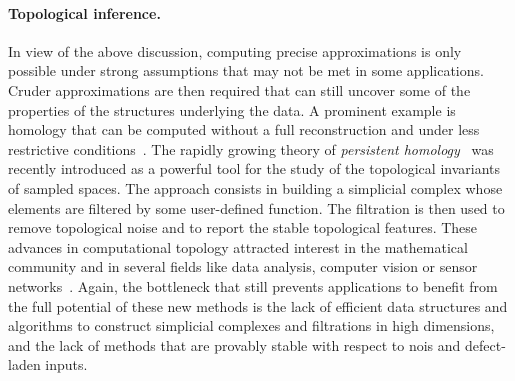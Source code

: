 \paragraph{Topological inference.}
In view of the above discussion, computing precise approximations is only possible under strong assumptions that may not be met in some applications. Cruder approximations are then required
that can still  uncover some of the properties of the structures underlying the data.
%
%
A prominent example is homology that can be computed  without a full reconstruction and under less restrictive conditions~\cite{geometrica-ccl09,nsw-fhm-2008}. The rapidly growing theory of {\em persistent homology}~\cite{eh-ph-2008,rg-bptd-2008} was recently introduced as a powerful tool for the study of the topological invariants of sampled spaces. The approach consists in building a simplicial complex whose elements are filtered by some user-defined function. The filtration is then used to remove topological noise and to report the stable topological features.  These advances in computational topology attracted interest in the mathematical community and in several fields like data analysis, computer vision or sensor networks~\cite{rg-bptd-2008}. Again, the bottleneck that still prevents applications to benefit from the full potential of these new methods is the lack of efficient data structures and algorithms to construct simplicial complexes and filtrations in high dimensions, and the lack of methods that are provably stable with respect to  nois and defect-laden inputs.


